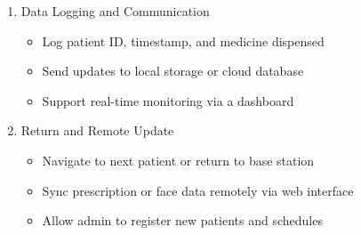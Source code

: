 \begin{enumerate}
    \item Data Logging and Communication
    \begin{itemize}
        \item Log patient ID, timestamp, and medicine dispensed
        \item Send updates to local storage or cloud database
        \item Support real-time monitoring via a dashboard
    \end{itemize}

    \item Return and Remote Update
    \begin{itemize}
        \item Navigate to next patient or return to base station
        \item Sync prescription or face data remotely via web interface
        \item Allow admin to register new patients and schedules
    \end{itemize}
\end{enumerate}




